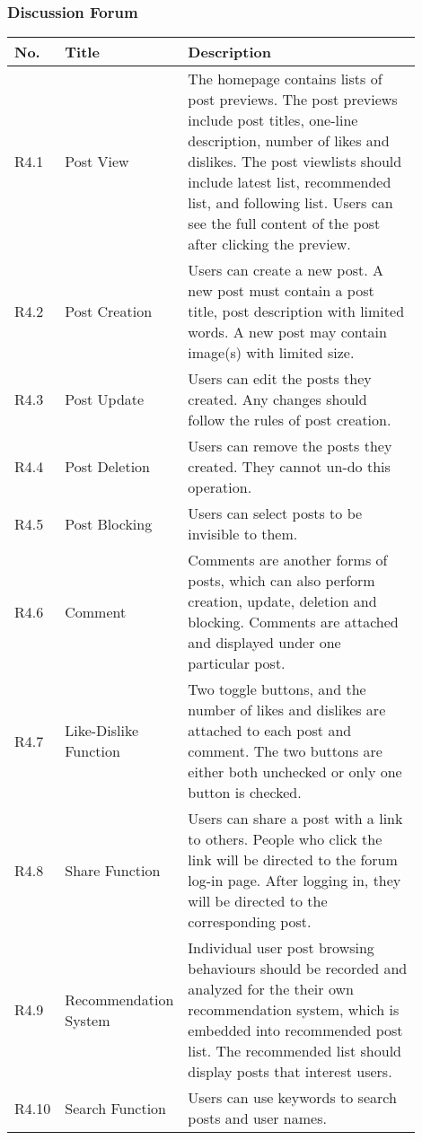 \documentclass[11pt, a4paper]{article}
\begin{document}
\subsubsection{Discussion Forum}
\begin{tabular}{|>{\centering\arraybackslash}m{0.1\linewidth}|>{\centering\arraybackslash}m{0.2\linewidth}|m{0.6\linewidth}|} \hline
     No.&  Title&Description\\ \hline 
     R4.1&   Post View&The homepage contains lists of post previews. The post previews include post titles, one-line description, number of likes and dislikes. The post viewlists should include latest list, recommended list, and following list. Users can see the full content of the post after clicking the preview.\\ \hline 
     R4.2&   Post Creation&Users can create a new post. A new post must contain a post title, post description with limited words.  A new post may contain image(s) with limited size.\\ \hline 
     R4.3&   Post Update &Users can edit the posts they created. Any changes should follow the rules of post creation.\\ \hline 
     R4.4&   Post Deletion&Users can remove the posts they created. They cannot un-do this operation.\\ \hline 
     R4.5&   Post Blocking&Users can select posts to be invisible to them.\\ \hline 
     R4.6&   Comment&Comments are another forms of posts, which can also perform creation, update, deletion and blocking. Comments are attached and displayed under one particular post. \\\hline
     R4.7& Like-Dislike Function&Two toggle buttons, and the number of likes and dislikes are attached to each post and comment. The two buttons are either both unchecked or only one button is checked.\\\hline
 R4.8& Share Function&Users can share a post with a link to others. People who click the link will be directed to the forum log-in page. After logging in, they will be directed to the corresponding post. \\\hline
 R4.9& Recommendation System&Individual user post browsing behaviours should be recorded and analyzed for the their own recommendation system, which is embedded into recommended post list. The recommended list should display posts that interest users.\\\hline
 R4.10& Search Function&Users can use keywords to search posts and user names.\\\hline
\end{tabular}
\end{document}
